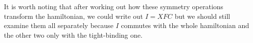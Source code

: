 It is worth noting that after working out how these symmetry operations transform the hamiltonian, we could write out $I = XFC$ but we should still examine them all separately because $I$ commutes with the whole hamiltonian and the other two only with the tight-binding one.


    



